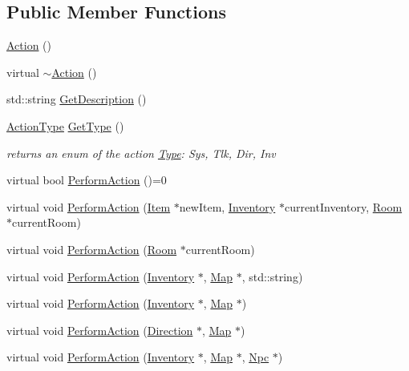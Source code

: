 \subsection*{Public Member Functions}
\begin{DoxyCompactItemize}
\item 
\mbox{\hyperlink{class_action_a4f457ccfc8336b565cadca56b36e0271}{Action}} ()
\item 
virtual \mbox{\hyperlink{class_action_abcf4c6358f53a666631ace11b325a7cd}{$\sim$\+Action}} ()
\item 
std\+::string \mbox{\hyperlink{class_action_a98298a95b5f2cd9212f301cd855ed06d}{Get\+Description}} ()
\item 
\mbox{\hyperlink{_action_8h_a21d5e8f8cdaa838586b31007df0a950b}{Action\+Type}} \mbox{\hyperlink{class_action_ab80590fc9e96653a15f28f4aaff1a13c}{Get\+Type}} ()
\begin{DoxyCompactList}\small\item\em returns an enum of the action \mbox{\hyperlink{class_type}{Type}}\+: \textquotesingle{}Sys, Tlk, Dir, Inv\textquotesingle{} \end{DoxyCompactList}\item 
virtual bool \mbox{\hyperlink{class_action_a4a775577f8bb8673d34f21bded80b55f}{Perform\+Action}} ()=0
\item 
virtual void \mbox{\hyperlink{class_action_a0e4daa8818c231a463cb728fb12f5424}{Perform\+Action}} (\mbox{\hyperlink{class_item}{Item}} $\ast$new\+Item, \mbox{\hyperlink{class_inventory}{Inventory}} $\ast$current\+Inventory, \mbox{\hyperlink{class_room}{Room}} $\ast$current\+Room)
\item 
virtual void \mbox{\hyperlink{class_action_a0da82536e6c7cec2088a3b1b9da2b16b}{Perform\+Action}} (\mbox{\hyperlink{class_room}{Room}} $\ast$current\+Room)
\item 
virtual void \mbox{\hyperlink{class_action_a1d808c406aea6161349fa9216a9be8cb}{Perform\+Action}} (\mbox{\hyperlink{class_inventory}{Inventory}} $\ast$, \mbox{\hyperlink{class_map}{Map}} $\ast$, std\+::string)
\item 
virtual void \mbox{\hyperlink{class_action_a82c8a777b8e70158c30da970b36dff65}{Perform\+Action}} (\mbox{\hyperlink{class_inventory}{Inventory}} $\ast$, \mbox{\hyperlink{class_map}{Map}} $\ast$)
\item 
virtual void \mbox{\hyperlink{class_action_a0dd798bc02051ef21e911b0ed7d04d00}{Perform\+Action}} (\mbox{\hyperlink{class_direction}{Direction}} $\ast$, \mbox{\hyperlink{class_map}{Map}} $\ast$)
\item 
virtual void \mbox{\hyperlink{class_action_a35d4aeec1e36a3889d9d7870a7ab868a}{Perform\+Action}} (\mbox{\hyperlink{class_inventory}{Inventory}} $\ast$, \mbox{\hyperlink{class_map}{Map}} $\ast$, \mbox{\hyperlink{class_npc}{Npc}} $\ast$)
\end{DoxyCompactItemize}
